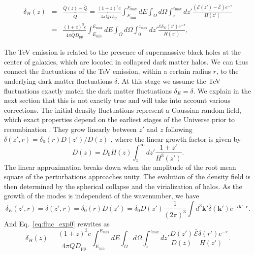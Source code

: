 \documentclass[numberedappendix]{emulateapj}
\begin{document}
\begin{eqnarray}
\label{eq:fluc_exp0}
\delta_H(z)&=&\frac{\dot{Q}(z)-\bar{\dot{Q}}}{\bar{\dot{Q}}}=\frac{(1+z)^3c}{4\pi\bar{\dot{Q}}D_{\mathrm{pp}}} \int_{E_{\mathrm{min}}}^{E_{\mathrm{max}}} dE\int_{\Omega}d\Omega\int_z^{z_{\mathrm{max}}} dz'\frac{ ( \mathcal{E}(z')-\bar{\mathcal{E}}) e^{-\tau}}{H(z')} \\ \nonumber
&=&\frac{(1+z)^3 c}{4\pi\bar{\dot{Q}}D_{\mathrm{pp}}} \int_{E_{\mathrm{min}}}^{E_{\mathrm{max}}} dE\int_{\Omega}d\Omega\int_0^{z_{\mathrm{max}}} dz' \frac{\bar{\mathcal{E}}\delta_E(z') e^{-\tau}}{H(z')},
\end{eqnarray}

The TeV emission is related to the presence of supermassive black holes at the center of galaxies, which are located in collapsed dark matter halos. We can thus connect the fluctuations of the TeV emission, within a certain radius $r$, to the underlying dark matter fluctuations $\delta$.
At this stage we assume the TeV fluctuations exactly match the dark matter fluctuations $\delta_E=\delta$. We explain in the next section that this is not exactly true and will take into account various corrections. The initial density fluctuations represent a Gaussian random field, which exact properties depend on the earliest stages of the Universe prior to recombination \citep{1986ApJ...304...15B,Peebles}. They grow linearly between $z'$ and $z$ following $\delta(z',r)=\delta_0(r)D(z')/D(z)$ \citep{ 1977MNRAS.179..351H}, where the linear growth factor is given by
\begin{equation}
\label{eq:growth_1}
D(z)=D_0H(z)\int_z^{\infty}dz'\frac{1+z'}{H^3(z')}.
\end{equation}
The linear approximation breaks down when the amplitude of the root mean square of the perturbations approaches unity. The evolution of the density field is then determined by the spherical collapse \citep{1972ApJ...176....1G} and the virialization of halos. As the growth of the modes is independent of the wavenumber, we have
\begin{equation}
\label{eq:FT_delta}
\delta_E(z',r)=\delta(z',r)=\delta_0(r)D(z')=\delta_0D(z')\frac{1}{(2\pi)^3}\int d^3\mathbf{k'} \tilde{\delta}(\mathbf{k'}) e^{-i\mathbf{k'}\cdot\mathbf{r}}.
\end{equation}
And Eq.~\eqref{eq:fluc_exp0} rewrites as
\begin{equation}
\label{eq:heat_fluc_exp0}
\delta_H(z)=\frac{(1+z)^3  c}{4\pi\bar{\dot{Q}}D_{\mathrm{pp}}}\int_{E_{\mathrm{min}}}^{E_{\mathrm{max}}} dE \int_{\Omega}d\Omega\int_z^{z_{\mathrm{max}}}dz' \frac{D(z')}{D(z)} \frac{\bar{\mathcal{E}}\delta(r') e^{-\tau}}{H(z')}.
\end{equation}
\end{document}
